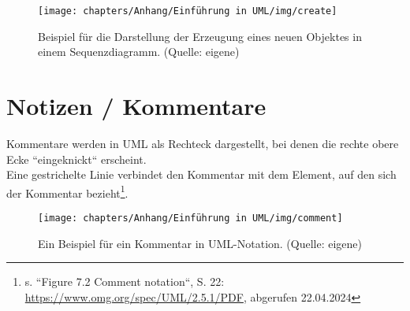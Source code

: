 \begin{figure}
    \centering
    \texttt{[image: chapters/Anhang/Einführung in UML/img/create]}
    \caption{Beispiel für die Darstellung der Erzeugung eines neuen Objektes in einem Sequenzdiagramm. (Quelle: eigene)}
    \label{fig:create}
\end{figure}

\section{Notizen / Kommentare}
Kommentare werden in UML als Rechteck dargestellt, bei denen die rechte obere Ecke ``eingeknickt`` erscheint.\\
Eine gestrichelte Linie verbindet den Kommentar mit dem Element, auf den sich der Kommentar bezieht\footnote{
s. ``Figure 7.2 Comment notation``, S. 22: \url{https://www.omg.org/spec/UML/2.5.1/PDF}, abgerufen 22.04.2024
}.

\begin{figure}
    \centering
    \texttt{[image: chapters/Anhang/Einführung in UML/img/comment]}
    \caption{Ein Beispiel für ein Kommentar in UML-Notation. (Quelle: eigene)}
    \label{fig:comment}
\end{figure}